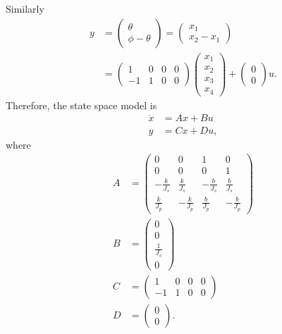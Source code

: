 Similarly
\begin{align*}
y&=\begin{pmatrix}\theta \\ \phi-\theta\end{pmatrix} = \begin{pmatrix}x_1 \\ x_2-x_1 \end{pmatrix} \\
&= \begin{pmatrix} 1 & 0 & 0 & 0 \\ -1 & 1 & 0 & 0 \end{pmatrix}\begin{pmatrix} x_1 \\ x_2 \\ x_3 \\ x_4 \end{pmatrix} + \begin{pmatrix} 0 \\ 0 \end{pmatrix} u.
\end{align*}
Therefore, the state space model is
\begin{align*}
\dot{x} &= Ax + Bu \\
y &= Cx + Du,
\end{align*}
where
\begin{align*}
A &= \begin{pmatrix} 0 & 0 & 1 & 0 \\ 0 & 0 & 0 & 1 \\ -\frac{k}{J_s} & \frac{k}{J_s} & -\frac{b}{J_s} & \frac{b}{J_s} \\ \frac{k}{J_p} & -\frac{k}{J_p} & \frac{b}{J_p} & -\frac{b}{J_p} \end{pmatrix} \\
B &= \begin{pmatrix} 0 \\ 0 \\ \frac{1}{J_s} \\ 0 \end{pmatrix} \\
C &= \begin{pmatrix} 1 & 0 & 0 & 0 \\ -1 & 1 & 0 & 0 \end{pmatrix} \\
D &= \begin{pmatrix} 0 \\ 0 \end{pmatrix}.
\end{align*}
